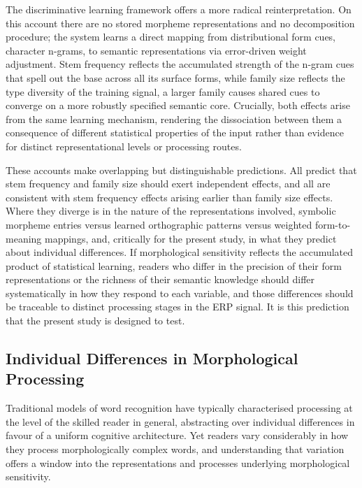 \documentclass[utf8]{FrontiersinHarvard} %
\begin{document}
The discriminative learning framework \citep[NDL/LDL;][]{CITATION} offers a more radical reinterpretation. On this account there are no stored morpheme representations and no decomposition procedure; the system learns a direct mapping from distributional form cues, character n-grams, to semantic representations via error-driven weight adjustment. Stem frequency reflects the accumulated strength of the n-gram cues that spell out the base across all its surface forms, while family size reflects the type diversity of the training signal, a larger family causes shared cues to converge on a more robustly specified semantic core. Crucially, both effects arise from the same learning mechanism, rendering the dissociation between them a consequence of different statistical properties of the input rather than evidence for distinct representational levels or processing routes.

These accounts make overlapping but distinguishable predictions. All predict that stem frequency and family size should exert independent effects, and all are consistent with stem frequency effects arising earlier than family size effects. Where they diverge is in the nature of the representations involved, symbolic morpheme entries versus learned orthographic patterns versus weighted form-to-meaning mappings, and, critically for the present study, in what they predict about individual differences. If morphological sensitivity reflects the accumulated product of statistical learning, readers who differ in the precision of their form representations or the richness of their semantic knowledge should differ systematically in how they respond to each variable, and those differences should be traceable to distinct processing stages in the ERP signal. It is this prediction that the present study is designed to test.


\subsection{Individual Differences in Morphological Processing}

Traditional models of word recognition have typically characterised processing at the level of the skilled reader in general, abstracting over individual differences in favour of a uniform cognitive architecture. Yet readers vary considerably in how they process morphologically complex words, and understanding that variation offers a window into the representations and processes underlying morphological sensitivity.
\end{document}
